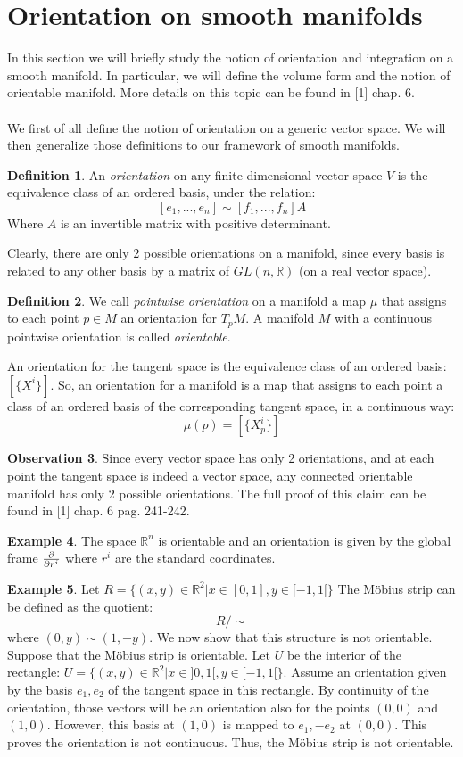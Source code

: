 \documentclass[12pt,a4paper]{report}
\theoremstyle{definition}
\newtheorem{Def}{Definition}[chapter]
\theoremstyle{Theorem}
\theoremstyle{definition}
\newtheorem{Ex}[Def]{Example}
\theoremstyle{definition}
\newtheorem{Obs}[Def]{Observation}
\begin{document}
	\section{Orientation on smooth manifolds}
	In this section we will briefly study the notion of orientation and integration on a smooth manifold. In particular, we will define the volume form and the notion of orientable manifold. More details on this topic can be found in [1] chap. 6.
	\\
	\\
	We first of all define the notion of orientation on a generic vector space. We will then generalize those definitions to our framework of smooth manifolds.
	\begin{Def}
		An \textit{orientation} on any finite dimensional vector space $V$ is the equivalence class of an ordered basis, under the relation:
		$$[e_1,...,e_n]\sim[f_1,...,f_n]A$$
		Where $A$ is an invertible matrix with positive determinant.
	\end{Def}
	Clearly, there are only 2 possible orientations on a manifold, since every basis is related to any other basis by a matrix of $GL(n,\mathbb{R})$ (on a real vector space).
	\begin{Def}
		We call \textit{pointwise orientation} on a manifold a map $\mu$ that assigns to each point $p\in M$ an orientation for $T_pM$. A manifold $M$ with a continuous pointwise orientation  is called \textit{orientable}.
	\end{Def}
	An orientation for the tangent space is the equivalence class of an ordered basis: $[\{X^i\}]$. So, an orientation for a manifold is a map that assigns to each point a class of an ordered basis of the corresponding tangent space, in a continuous way:
	$$\mu(p)=[\{X^i_p\}]$$
	\begin{Obs}
		Since every vector space has only 2 orientations, and at each point the tangent space is indeed a vector space, any connected orientable manifold has only 2 possible orientations. The full proof of this claim can be found in [1] chap. 6 pag. 241-242.
	\end{Obs}
	\begin{Ex}
		The space $\mathbb{R}^n$ is orientable and an orientation is given by the global frame ${\partial\over \partial{r^i}}$ where $r^i$ are the standard coordinates.
	\end{Ex}
	\begin{Ex}
		Let $R=\{(x,y)\in \mathbb{R}^2|x\in[0,1], y\in [-1,1[\}$
		The Möbius strip can be defined as the quotient: 
		$$R\slash\sim$$ 
		where $(0,y)\sim(1,-y)$. We now show that this structure is not orientable.\\
		Suppose that the Möbius strip is orientable. Let $U$ be the interior of the rectangle: $U=\{(x,y)\in \mathbb{R}^2|x\in]0,1[, y\in [-1,1[\}$. Assume an orientation given by the basis $e_1,e_2$ of the tangent space in this rectangle. By continuity of the orientation, those vectors will be an orientation also for the points $(0,0)$ and $(1,0)$. However, this basis at $(1,0)$ is mapped to $e_1,-e_2$ at $(0,0)$. This proves the orientation is not continuous. Thus, the Möbius strip is not orientable.
	\end{Ex}
\end{document}
